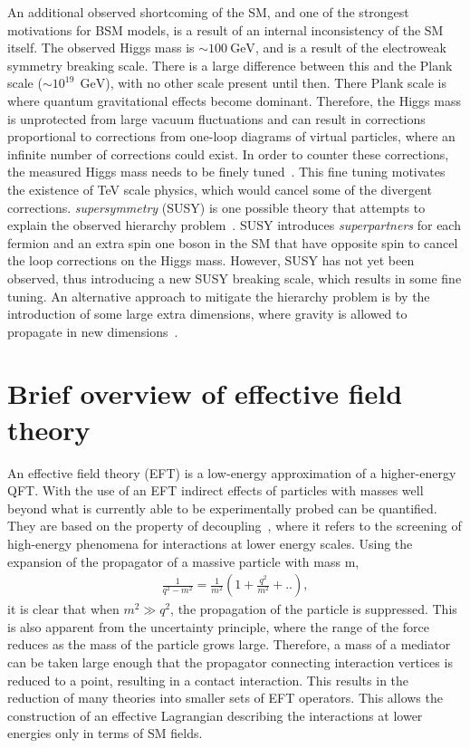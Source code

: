 An additional observed shortcoming of the SM, and one of the strongest motivations for BSM models, is a result of an internal inconsistency of the SM itself. The observed Higgs mass is $\sim \SI{100}{\giga\electronvolt}$, and is a result of the electroweak symmetry breaking scale. There is a large difference between this and the Plank scale ($\sim 10^19~\SI{}{\giga\electronvolt}$), with no other scale present until then. There Plank scale is where quantum gravitational effects become dominant. Therefore, the Higgs mass is unprotected from large vacuum fluctuations and can result in corrections proportional to corrections from one-loop diagrams of virtual particles, where an infinite number of corrections could exist. In order to counter these corrections, the measured Higgs mass needs to be finely tuned~\cite{Giudice_2008}. This fine tuning motivates the existence of TeV scale physics, which would cancel some of the divergent corrections. \emph{supersymmetry} (SUSY) is one possible theory that attempts to explain the observed hierarchy problem~\cite{MARTIN_1998}. SUSY introduces \emph{superpartners} for each fermion and an extra spin one boson in the SM that have opposite spin to cancel the loop corrections on the Higgs mass. However, SUSY has not yet been observed, thus introducing a new SUSY breaking scale, which results in some fine tuning. An alternative approach to mitigate the hierarchy problem is by the introduction of some large extra dimensions, where gravity is allowed to propagate in new dimensions~\cite{Arkani_Hamed_1998}. 

\section{Brief overview of effective field theory}
An effective field theory (EFT) is a low-energy approximation of a higher-energy QFT. With the use of an EFT indirect effects of particles with masses well beyond what is currently able to be experimentally probed can be quantified. They are based on the property of decoupling~\cite{manohar2018introduction}, where it refers to the screening of high-energy phenomena for interactions at lower energy scales. Using the expansion of the propagator of a massive particle with mass m, 
\begin{equation}
    \label{eq:propogator}
    \begin{aligned}
        \frac{1}{q^2 - m^2} = \frac{1}{m^2}(1 + \frac{q^2}{m^2} + ..),
     \end{aligned}
\end{equation}
it is clear that when $m^2 \gg q^2$, the propagation of the particle is suppressed. This is also apparent from the uncertainty principle, where the range of the force reduces as the mass of the particle grows large. Therefore, a mass of a mediator can be taken large enough that the propagator connecting interaction vertices is reduced to a point, resulting in a contact interaction. This results in the reduction of many theories into smaller sets of EFT operators. This allows the construction of an effective Lagrangian describing the interactions at lower energies only in terms of SM fields. 

